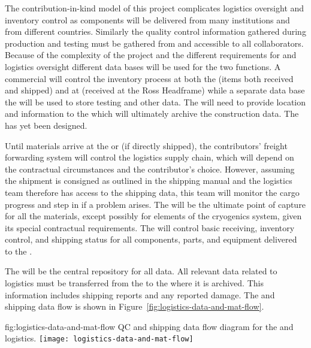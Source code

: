 The contribution-in-kind model of this project complicates logistics oversight and inventory control as components will be delivered from many institutions and from different countries. 
Similarly the quality control information gathered during production and testing must be gathered from and accessible to all collaborators. 
Because of the complexity of the project and the different requirements for  and logistics oversight different data bases will be used for the two functions. A commercial  will control the inventory process at both the  (items both received and shipped) and at  (received at the Ross Headframe) while a separate data base the  will be used to store testing and other  data. The  will need to provide location and   information to the  which will ultimately archive the construction data. The  has yet been designed.

Until materials arrive at the  or  (if directly shipped), the contributors' freight forwarding system will control the logistics supply chain, which will depend on the contractual circumstances and the contributor's choice. 
However, assuming the shipment is consigned as outlined in the 
shipping manual and the  logistics team therefore has access to the shipping data, this team will monitor the cargo progress and step in if a problem arises.
The  will be the ultimate point of capture for 
all the materials, except possibly for elements of the cryogenics system, given its special contractual requirements. The  will control basic receiving, inventory control, and shipping status for all components, parts, and equipment delivered to the .


The  will be the central repository for all  data. All relevant  data related to logistics must be transferred from the  to the  where it is archived. This information includes shipping reports and any reported damage. 
The  and shipping data flow is shown in Figure~\ref{fig:logistics-data-and-mat-flow}.

 


\begin{dunefigure}{fig:logistics-data-and-mat-flow}
  {QC and shipping data flow diagram for the  and  logistics.}
 \texttt{[image: logistics-data-and-mat-flow]}
\end{dunefigure}

